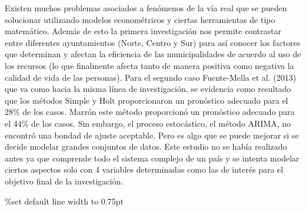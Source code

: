 \documentclass[
  british,
]{article}
\begin{document}
Existen muchos problemas asociados a fenómenos de la vía real que se
pueden solucionar utilizando modelos econométricos y ciertas
herramientas de tipo matemático. Además de esto la primera investigación
nos permite contrastar entre diferentes ayuntamientos (Norte, Centro y
Sur) para así conocer los factores que determinan y afectan la
eficiencia de las municipalidades de acuerdo al uso de los recursos (lo
que finalmente afecta tanto de manera positiva como negativa la calidad
de vida de las personas). Para el segundo caso Fuente-Mella et al.
(2013) que va como hacia la misma línea de investigación, se evidencia
como resultado que los métodos Simple y Holt proporcionaron un
pronóstico adecuado para el 28\% de los casos. Marrón este método
proporcionó un pronóstico adecuado para el 44\% de los casos. Sin
embargo, el proceso estocástico, el método ARIMA, no encontró una bondad
de ajuste aceptable. Pero es algo que se puede mejorar si se decide
modelar grandes conjuntos de datos. Este estudio no se había realizado
antes ya que comprende todo el sistema complejo de un país y se intenta
modelar ciertos aspectos solo con 4 variables determinadas como las de
interés para el objetivo final de la investigación.

 \%set default line
width to 0.75pt
\end{document}
